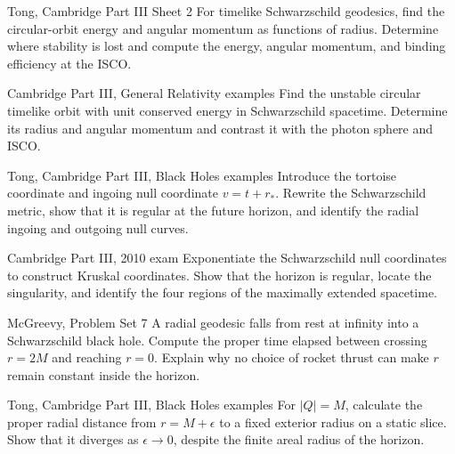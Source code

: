 \begin{exercise}{Tong, Cambridge Part III Sheet 2}
For timelike Schwarzschild geodesics, find the circular-orbit energy and
angular momentum as functions of radius.  Determine where stability is lost
and compute the energy, angular momentum, and binding efficiency at the ISCO.
\end{exercise}

\begin{exercise}{Cambridge Part III, General Relativity examples}
Find the unstable circular timelike orbit with unit conserved energy in
Schwarzschild spacetime.  Determine its radius and angular momentum and
contrast it with the photon sphere and ISCO.
\end{exercise}

\begin{exercise}{Tong, Cambridge Part III, Black Holes examples}
Introduce the tortoise coordinate and ingoing null coordinate
\(v=t+r_\ast\).  Rewrite the Schwarzschild metric, show that it is regular at
the future horizon, and identify the radial ingoing and outgoing null curves.
\end{exercise}

\begin{exercise}{Cambridge Part III, 2010 exam}
Exponentiate the Schwarzschild null coordinates to construct Kruskal
coordinates.  Show that the horizon is regular, locate the singularity, and
identify the four regions of the maximally extended spacetime.
\end{exercise}

\begin{exercise}{McGreevy, Problem Set 7}
A radial geodesic falls from rest at infinity into a Schwarzschild black hole.
Compute the proper time elapsed between crossing \(r=2M\) and reaching
\(r=0\).  Explain why no choice of rocket thrust can make \(r\) remain
constant inside the horizon.
\end{exercise}

\begin{exercise}{Tong, Cambridge Part III, Black Holes examples}
For \(|Q|=M\), calculate the proper radial distance from \(r=M+\epsilon\) to a
fixed exterior radius on a static slice.  Show that it diverges as
\(\epsilon\to0\), despite the finite areal radius of the horizon.
\end{exercise}

